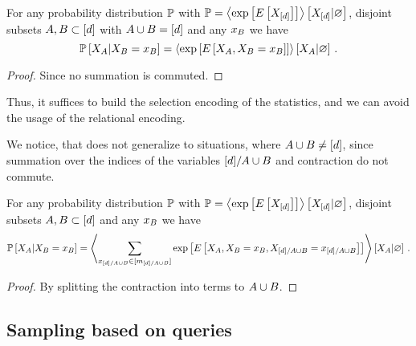 \begin{lemma}\label{lem:energyContractionQueries} %
	For any probability distribution $\mathbb{P}$ with $\mathbb{P}= \left\langle \mathrm{exp}\left[E\left[X_{[d]}\right]\right]\right\rangle \left[ X_{[d]} | \varnothing \right]$, disjoint subsets $A,B \subset [d]$ with $A\cup B=[d]$  and any $x_{B}$ we have
		\[ \mathbb{P}\left[X_{A}|X_{B}=x_{B}\right] 
			= \left\langle 
				\mathrm{exp}\left[E\left[X_{A},X_{B}=x_{B}\right]\right]
		\right\rangle \left[ X_{A} | \varnothing \right] \, .\]
\end{lemma}
\begin{proof}
	Since no summation is commuted.
\end{proof}

Thus, it suffices to build the selection encoding of the statistics, and we can avoid the usage of the relational encoding.

% 
We notice, that  does not generalize to situations, where $A\cup B\neq[d]$, since summation over the indices of the variables $[d]/A\cup B$ and contraction do not commute.


\begin{lemma}  %
	For any probability distribution $\mathbb{P}$ with $\mathbb{P}= \left\langle \mathrm{exp}\left[E\left[X_{[d]}\right]\right]\right\rangle \left[ X_{[d]} | \varnothing \right]$, disjoint subsets $A,B \subset [d]$ and any $x_{B}$ we have
		\[ \mathbb{P}\left[X_{A}|X_{B}=x_{B}\right] 
			=
			\left\langle 
			 \sum_{x_{[d]/A\cup B}\in[m_{[d]/A\cup B}]} 
				 \mathrm{exp}\left[E\left[X_{A},X_{B}=x_{B},X_{[d]/A\cup B}=x_{[d]/A\cup B}\right]\right]
		\right\rangle \left[ X_{A} | \varnothing \right] \, .\]
\end{lemma}
\begin{proof}
	By splitting the contraction into terms to $A\cup B$. %
\end{proof}




\subsection{Sampling based on queries}


